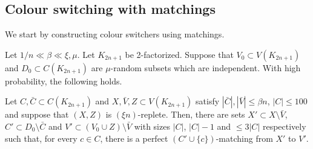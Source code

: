 \subsection{Colour switching with matchings}\label{sec:switcherspaths}
We start by constructing colour switchers using matchings.
\begin{lemma}\label{absorbA} Let $1/n\ll \beta \ll\xi, \mu$. Let $K_{2n+1}$ be 2-factorized. Suppose that $V_0\subset V(K_{2n+1})$ and $D_0\subset C(K_{2n+1})$ are $\mu$-random subsets which are independent. With high probability, the following holds.

Let $C,\bar{C}\subset C(K_{2n+1})$ and $X,\bar{V},Z\subset V(K_{2n+1})$ satisfy $|\bar{{C}}|,|\bar{V}|\leq \beta n$, $|C|\leq 100$ and suppose that $(X,Z)$ is $(\xi n)$-replete.
Then, there are sets $X'\subset X\setminus \bar{V}$, $C'\subset D_0\setminus \bar{C}$ and $V'\subset (V_0\cup Z)\setminus \bar{V}$ with sizes $|C|$, $|C|-1$ and $\leq 3|C|$ respectively such that, for every $c\in C$, there is a perfect $(C'\cup \{c\})$-matching from $X'$ to $V'$.
\end{lemma}
